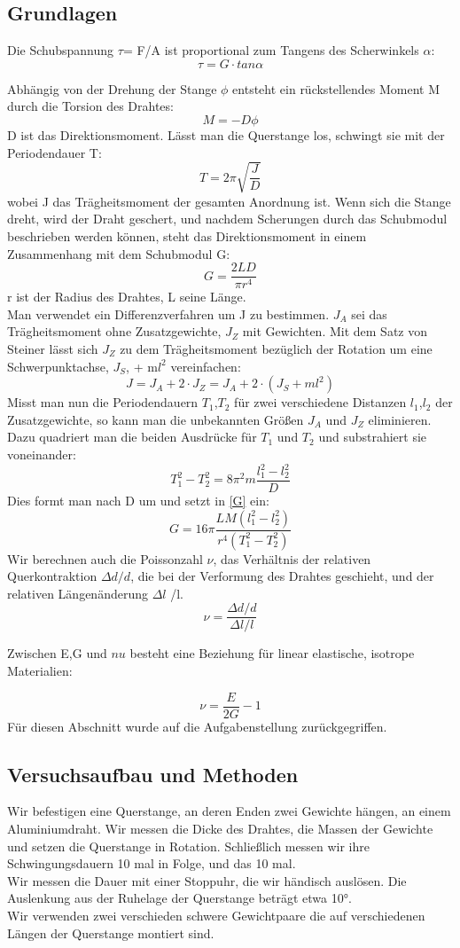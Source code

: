 \documentclass{article}
\begin{document}
\subsection{Grundlagen}
Die Schubspannung $\tau$= F/A ist proportional zum Tangens des Scherwinkels $\alpha$:
$$ \tau = G\cdot	tan\alpha$$

Abhängig von der Drehung der Stange $\phi$ entsteht ein rückstellendes Moment M durch die Torsion des Drahtes:
$$M=-D\phi$$
D ist das Direktionsmoment. Lässt man die Querstange los, schwingt sie mit der Periodendauer T:
$$T=2\pi \sqrt{\frac{J}{D}}$$
wobei J das Trägheitsmoment der gesamten Anordnung ist. Wenn sich die Stange dreht, wird der Draht geschert, und nachdem Scherungen durch das Schubmodul beschrieben werden können, steht das Direktionsmoment in einem Zusammenhang mit dem Schubmodul G:
\begin{equation} 
\label{G}
G = \frac{2LD}{\pi r^4}
\end{equation}
r ist der Radius des Drahtes, L seine Länge. \\
Man verwendet ein Differenzverfahren um J zu bestimmen. $J_A$ sei das Trägheitsmoment ohne Zusatzgewichte, $J_Z$ mit Gewichten. Mit dem Satz von Steiner lässt sich $J_Z$ zu dem Trägheitsmoment bezüglich der Rotation um eine Schwerpunktachse, $J_S$, + m$l^2$ vereinfachen:
\begin{equation} \label{J}
J =  J_A + 2\cdot J_Z = J_A + 2 \cdot (J_S + ml^2)
\end{equation} 
Misst man nun die Periodendauern $T_1$,$T_2$ für zwei verschiedene Distanzen $l_1$,$l_2$ der Zusatzgewichte, so kann man die unbekannten Größen $J_A$ und $J_Z$ eliminieren. Dazu quadriert man die beiden Ausdrücke für $T_1$ und $T_2$ und substrahiert sie voneinander: 
$$T_1^2-T_2^2 = 8 \pi^2m\frac{l_1^2-l_2^2}{D}$$
Dies formt man nach D um und setzt in  \ref{G} ein:
\begin{equation}
\label{Gfinal}
G=16\pi\frac{LM(l_1^2-l_2^2)}{r^4(T_1^2-T_2^2)}
\end{equation} 
Wir berechnen auch die Poissonzahl $\nu$, das Verhältnis der relativen Querkontraktion $\Delta d / d$, die bei der Verformung des Drahtes geschieht, und der relativen Längenänderung $\Delta l$ /l.
$$\nu=\frac{\Delta d / d}{\Delta l / l} $$

Zwischen E,G und $nu$ besteht eine Beziehung für linear elastische, isotrope Materialien:

$$\nu = \frac{E}{2G} -1$$
Für diesen Abschnitt wurde auf die Aufgabenstellung zurückgegriffen.
\subsection{Versuchsaufbau und Methoden}
Wir befestigen eine Querstange, an deren Enden zwei Gewichte hängen, an einem Aluminiumdraht. Wir messen die Dicke des Drahtes, die Massen der Gewichte und setzen die Querstange in Rotation. Schließlich messen wir ihre Schwingungsdauern 10 mal in Folge, und das 10 mal. \\
Wir messen die Dauer mit einer Stoppuhr, die wir händisch auslösen. Die Auslenkung aus der Ruhelage der Querstange beträgt etwa 10°. \\
Wir verwenden zwei verschieden schwere Gewichtpaare die auf verschiedenen Längen der Querstange montiert sind.
\end{document}
